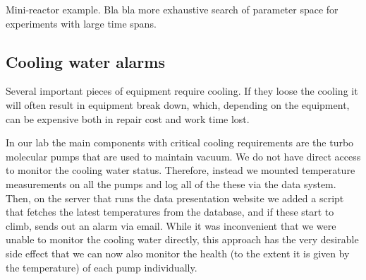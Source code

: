 Mini-reactor example. Bla bla more exhaustive search of parameter
space for experiments with large time spans. 

\subsection{Cooling water alarms}\label{sec:cooling_water_alarms}
Several important pieces of equipment require cooling. If they loose
the cooling it will often result in equipment break down, which,
depending on the equipment, can be expensive both in repair cost and
work time lost.

In our lab the main components with critical cooling requirements are
the turbo molecular pumps that are used to maintain vacuum. We do not
have direct access to monitor the cooling water status. Therefore,
instead we mounted temperature measurements on all the pumps and log
all of the these via the data system. Then, on the server that runs
the data presentation website we added a script that fetches the
latest temperatures from the database, and if these start to climb,
sends out an alarm via email. While it was inconvenient that we were
unable to monitor the cooling water directly, this approach has the
very desirable side effect that we can now also monitor the health (to
the extent it is given by the temperature) of each pump
individually.
